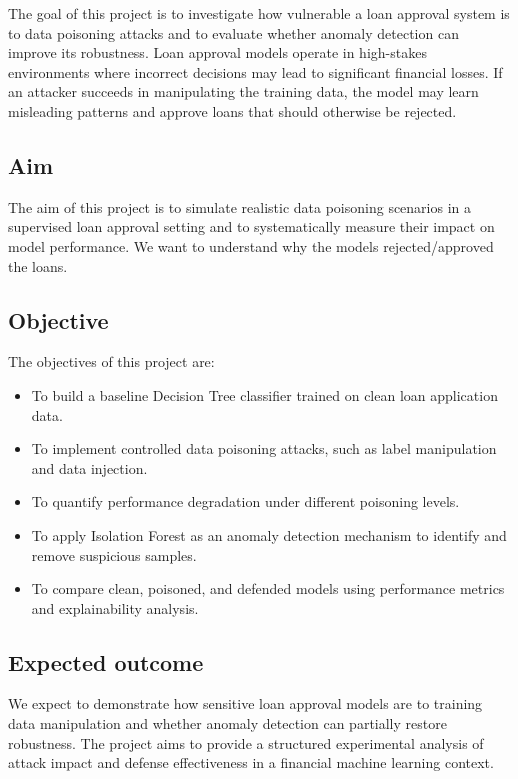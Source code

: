 \documentclass[conference]{IEEEtran}
\begin{document}
The goal of this project is to investigate how vulnerable a loan approval system is to data poisoning attacks and to evaluate whether anomaly detection can improve its robustness. Loan approval models operate in high-stakes environments where incorrect decisions may lead to significant financial losses. If an attacker succeeds in manipulating the training data, the model may learn misleading patterns and approve loans that should otherwise be rejected.

\subsection{Aim}

The aim of this project is to simulate realistic data poisoning scenarios in a supervised loan approval setting and to systematically measure their impact on model performance. We want to understand why the models rejected/approved the loans.

\subsection{Objective}

The objectives of this project are:

\begin{itemize}
    \item To build a baseline Decision Tree classifier trained on clean loan application data.
    \item To implement controlled data poisoning attacks, such as label manipulation and data injection.
    \item To quantify performance degradation under different poisoning levels.
    \item To apply Isolation Forest as an anomaly detection mechanism to identify and remove suspicious samples.
    \item To compare clean, poisoned, and defended models using performance metrics and explainability analysis.
    
\end{itemize}

\subsection{Expected outcome}

We expect to demonstrate how sensitive loan approval models are to training data manipulation and whether anomaly detection can partially restore robustness. The project aims to provide a structured experimental analysis of attack impact and defense effectiveness in a financial machine learning context.
\end{document}

